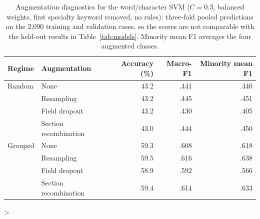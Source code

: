 \documentclass[twocolumn,10pt]{article}
\begin{document}
\begin{table}[H]
\centering\small
\begin{tabular}{llrrr}
\toprule
Regime & Augmentation & Accuracy (\%) & Macro-F1 & Minority mean F1\\\midrule
Random & None &43.2&.441&.440\\
& Resampling &43.2&.445&.451\\
& Field dropout &43.2&.430&.405\\
& Section recombination &43.0&.444&.450\\
Grouped & None &59.3&.608&.618\\
& Resampling &59.5&.616&.638\\
& Field dropout &58.9&.592&.566\\
& Section recombination &59.4&.614&.633\\\bottomrule
\end{tabular}
\caption{Augmentation diagnostics for the word/character SVM ($C=0.3$, balanced weights, first specialty keyword removed, no rules): three-fold pooled predictions on the 2,090 training and validation cases, so the scores are not comparable with the held-out results in Table~\ref{tab:models}. Minority mean F1 averages the four augmented classes.}\label{tab:aug}
\end{table}
\clearpage
\addtocounter{appendixstart}{1}
\ifnum\value{page}>\value{appendixstart} \fi
\end{document}
